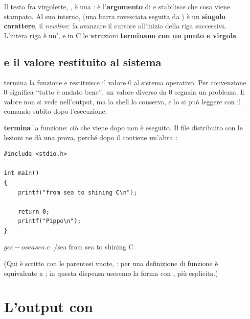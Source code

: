 Il testo fra virgolette, , è
una : è l'\textbf{argomento} di  e
stabilisce che cosa viene stampato. Al suo interno, 
(una barra rovesciata seguita da ) è un \textbf{singolo carattere},
il \textit{newline}: fa avanzare il cursore all'inizio della riga
successiva. L'intera riga è un', e in C le istruzioni
\textbf{terminano con un punto e virgola}.

\subsection{ e il valore restituito al sistema}

 termina la funzione  e restituisce il valore 0
al sistema operativo. Per convenzione 0 significa “tutto è andato bene”,
un valore diverso da 0 segnala un problema. Il valore non si vede
nell'output, ma la shell lo conserva, e lo si può leggere con il comando
 subito dopo l'esecuzione:


 \textbf{termina} la funzione: ciò che viene dopo non è
eseguito. Il file  distribuito con le lezioni ne dà una prova,
perché dopo il  contiene un'altra :

\begin{affianco}[0.5]
\begin{lstlisting}[style=c, name=sea.c]
#include <stdio.h>

int main()
{
    printf("from sea to shining C\n");

    return 0;
    printf("Pippo\n");
}
\end{lstlisting}
\risultato
\begin{console}
$ gcc -o sea sea.c
$ ./sea
from sea to shining C
\end{console}
\end{affianco}

(Qui  è scritto con le parentesi vuote, : per una
definizione di funzione è equivalente a ; in questa
dispensa useremo la forma con , più esplicita.)

\section{L'output con }

